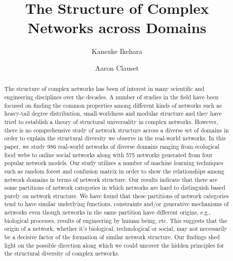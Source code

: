 \documentclass[%
 reprint,
 amsmath,amssymb,
 aps,
superscriptaddress,
]{revtex4-1}
\begin{document}

\title{The Structure of Complex Networks across Domains}%

\author{Kansuke Ikehara}

 
\author{Aaron Clauset}

 

\begin{abstract}
The structure of complex networks has been of interest in many scientific and engineering disciplines over the decades. A number of studies in the field have been focused on finding the common properties among different kinds of networks such as heavy-tail degree distribution, small-worldness and modular structure and they have tried to establish a theory of structural universality in complex networks. However, there is no comprehensive study of network structure across a diverse set of domains in order to explain the structural diversity we observe in the real-world networks. In this paper, we study 986 real-world networks of diverse domains ranging from ecological food webs to online social networks along with 575 networks generated from four popular network models. Our study utilizes a number of  machine learning techniques such as random forest and confusion matrix in order to show the relationships among network domains in terms of network structure. Our results indicate that there are some partitions of network categories in which networks are hard to distinguish based purely on network structure. We have found that these partitions of network categories tend to have similar underlying functions, constraints and/or generative mechanisms of networks even though networks in the same partition have different origins, e.g., biological processes, results of engineering by human being, etc. This suggests that the origin of a network, whether it's biological, technological or social, may not necessarily be a decisive factor of the formation of similar network structure. Our findings shed light on the possible direction along which we could uncover the hidden principles for the structural diversity of complex networks.
\end{abstract}

\maketitle












\nocite{*}
\end{document}
